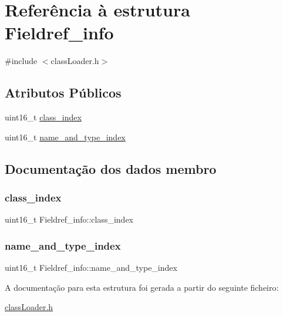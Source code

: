 \hypertarget{struct_fieldref__info}{}\section{Referência à estrutura Fieldref\+\_\+info}
\label{struct_fieldref__info}


{\ttfamily \#include $<$class\+Loader.\+h$>$}

\subsection*{Atributos Públicos}
\begin{DoxyCompactItemize}
\item 
uint16\+\_\+t \hyperlink{struct_fieldref__info_a852750e1601bb1721205452d5a5872d0}{class\+\_\+index}
\item 
uint16\+\_\+t \hyperlink{struct_fieldref__info_a29bb75b60bc85f7b187a473f33ebec5b}{name\+\_\+and\+\_\+type\+\_\+index}
\end{DoxyCompactItemize}


\subsection{Documentação dos dados membro}
\hypertarget{struct_fieldref__info_a852750e1601bb1721205452d5a5872d0}{}\label{struct_fieldref__info_a852750e1601bb1721205452d5a5872d0} 
\subsubsection{\texorpdfstring{class\+\_\+index}{class\_index}}
{\footnotesize\ttfamily uint16\+\_\+t Fieldref\+\_\+info\+::class\+\_\+index}

\hypertarget{struct_fieldref__info_a29bb75b60bc85f7b187a473f33ebec5b}{}\label{struct_fieldref__info_a29bb75b60bc85f7b187a473f33ebec5b} 
\subsubsection{\texorpdfstring{name\+\_\+and\+\_\+type\+\_\+index}{name\_and\_type\_index}}
{\footnotesize\ttfamily uint16\+\_\+t Fieldref\+\_\+info\+::name\+\_\+and\+\_\+type\+\_\+index}



A documentação para esta estrutura foi gerada a partir do seguinte ficheiro\+:\begin{DoxyCompactItemize}
\item 
\hyperlink{class_loader_8h}{class\+Loader.\+h}\end{DoxyCompactItemize}
